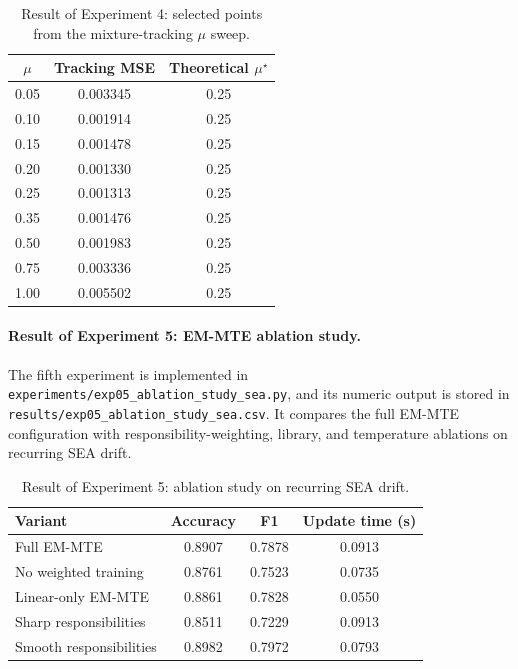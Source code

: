 ﻿\documentclass[12pt,a4paper]{article}
\begin{document}
\begin{table}[H]
\centering
\caption{Result of Experiment 4: selected points from the mixture-tracking $\mu$ sweep.}
\label{tab:exp04_tracking_mu_result}
\renewcommand{\arraystretch}{1.25}
\begin{tabular}{ccc}
\toprule
\textbf{$\mu$} & \textbf{Tracking MSE} & \textbf{Theoretical $\mu^\star$}\\
\midrule
0.05 & 0.003345 & 0.25\\
0.10 & 0.001914 & 0.25\\
0.15 & 0.001478 & 0.25\\
0.20 & 0.001330 & 0.25\\
0.25 & 0.001313 & 0.25\\
0.35 & 0.001476 & 0.25\\
0.50 & 0.001983 & 0.25\\
0.75 & 0.003336 & 0.25\\
1.00 & 0.005502 & 0.25\\
\bottomrule
\end{tabular}
\end{table}

\paragraph{Result of Experiment 5: EM-MTE ablation study.}
The fifth experiment is implemented in
\texttt{experiments/exp05\_ablation\_study\_sea.py}, and its numeric output is
stored in \texttt{results/exp05\_ablation\_study\_sea.csv}. It compares the
full EM-MTE configuration with responsibility-weighting, library, and
temperature ablations on recurring SEA drift.

\begin{table}[H]
\centering
\caption{Result of Experiment 5: ablation study on recurring SEA drift.}
\label{tab:exp05_ablation_result}
\renewcommand{\arraystretch}{1.25}
\begin{tabular}{lccc}
\toprule
\textbf{Variant} & \textbf{Accuracy} & \textbf{F1} & \textbf{Update time (s)}\\
\midrule
Full EM-MTE & 0.8907 & 0.7878 & 0.0913\\
No weighted training & 0.8761 & 0.7523 & 0.0735\\
Linear-only EM-MTE & 0.8861 & 0.7828 & 0.0550\\
Sharp responsibilities & 0.8511 & 0.7229 & 0.0913\\
Smooth responsibilities & 0.8982 & 0.7972 & 0.0793\\
\bottomrule
\end{tabular}
\end{table}
\end{document}
